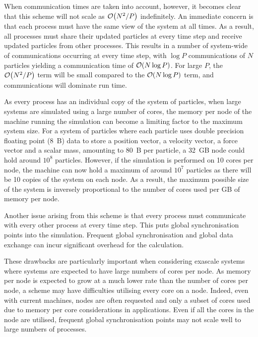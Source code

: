 %
When communication times are taken into account, however, it becomes
clear that this scheme will not scale as $\mathcal{O}{\left({ N^2/P }\right)}$ indefinitely.
%
An immediate concern is that each process must have the same view of the
system at all times.
%
As a result, all processes must share their updated particles at
every time step and receive updated particles from other processes.
%
This results in a number of system-wide of communications occurring
at every time step,
with $\log{P}$ communications of $N$ particles
yielding a communication time of $\mathcal{O}{\left({ N \log{P} }\right)}$.
%
For large $P$, the $\mathcal{O}{\left({ N^2/P }\right)}$ term will be small compared to the
$\mathcal{O}{\left({ N\log{P} }\right)}$ term, and communications will dominate run time.

As every process has an individual copy of the system of particles,
when large systems are simulated using a large number of cores,
the memory per node of the machine running the simulation
can become a limiting factor to the maximum system size.
%
For a system of particles where each particle uses double
precision floating point (8~B) data to store
a position vector,
a velocity vector,
a force vector and
a scalar mass,
amounting to 80~B per particle, a 32~GB node could hold around $10^8$
particles.
%
However, if the simulation is performed on 10 cores per node,
the machine can now hold a maximum of around $10^7$ particles
as there will be 10 copies of the system on each node.
%
As a result, the maximum possible size of the system is
inversely proportional to
the number of cores used per GB of memory per node.

Another issue arising from this scheme is
that every process must communicate with
every other process at every time step.
%
This puts global synchronisation points into the simulation.
%
Frequent global synchronisation and global data exchange can incur
significant overhead for the calculation.

%
These drawbacks are particularly important when considering exascale systems
where systems are expected to have large numbers of cores per node.
%
As memory per node is expected to grow at a much lower rate than
the number of cores per node,
a \replicateddata{} scheme may have difficulties
utilising every core on a node.
%
Indeed, even with current machines, nodes are often requested and only a
subset of cores used due to memory per core considerations in applications.
%
Even if all the cores in the node are utilised, frequent global synchronisation
points may not scale well to large numbers of processes.



